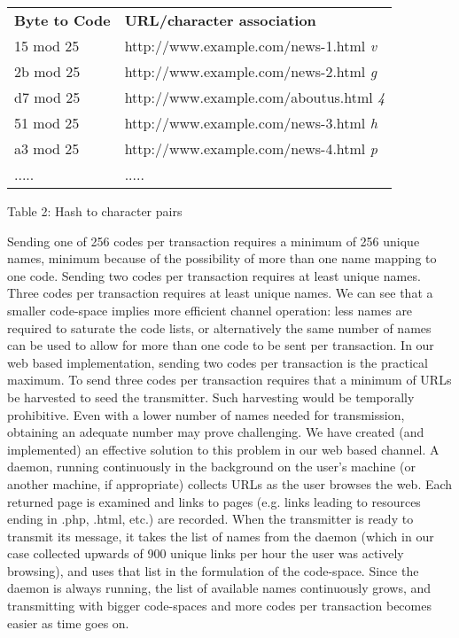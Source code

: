 \documentclass[10pt, conference]{IEEEtran}
\begin{document}
\begin{table*}[ht]
 \centering
  \begin{tabular}{| l | l | }
    \hline
    {\bf Byte to Code} & {\bf URL/character association}\\
    15 mod 25 & http://www.example.com/news-1.html  {\em v} \\
    2b mod 25 & http://www.example.com/news-2.html  {\em g} \\
    d7 mod 25 & http://www.example.com/aboutus.html  {\em 4} \\
    51 mod 25 & http://www.example.com/news-3.html  {\em h} \\
    a3 mod 25 & http://www.example.com/news-4.html  {\em p} \\
    ..... & .....\\
    \hline
  \end{tabular}
  \begin{center} Table 2: Hash to character pairs\end{center}
\end{table*}

Sending one of 256 codes per transaction requires a minimum of 256 unique names, minimum because of the possibility of more than one name mapping to one code.  
Sending two codes per transaction requires at least  unique names.   Three codes per transaction requires at least  unique names.
We can see that a smaller code-space implies more efficient channel operation: less names are required to saturate the code lists, or alternatively the same number of names can be used to allow for more than one code to be sent per transaction.  In our web based  implementation, sending two codes per transaction is the practical maximum.  To send three codes per transaction requires that a minimum of  URLs be harvested to seed the transmitter.  Such harvesting would be temporally prohibitive.  Even with a lower number of names needed for transmission, obtaining an adequate number may prove challenging.  We have created (and implemented) an effective solution to this problem in our web based channel.  A daemon, running continuously in the background on the user's machine (or another machine, if appropriate) collects URLs as the user browses the web.  Each returned page is examined and links to pages (e.g. links leading to resources ending in .php, .html, etc.) are recorded.  When the transmitter is ready to transmit its message, it takes the list of names from the daemon (which in our case collected upwards of 900 unique links per hour the user was actively browsing), and uses that list in the formulation of the code-space.  Since the daemon is always running, the list of available names continuously grows, and transmitting with bigger code-spaces and more codes per transaction becomes easier as time goes on.
\end{document}
